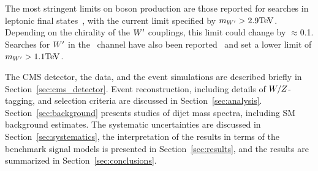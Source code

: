 The most stringent limits on \PWpr boson production  are those reported
for searches in leptonic final
states~\cite{CMSwprimePAPER2013,ATLASwprimePAPER}, with the current
limit specified by $m_{W'}>2.9\mathrm{TeV}$. Depending on the chirality
of the $W'$ couplings, this limit could change by $\approx$0.1\TeVcc. Searches for $W'$ in the \PW\cPZ\ channel have also been
reported~\cite{CMSwprimeWZPAS,ATLASWWPAPER,ATLASwprimeWZPAS} and set
a lower limit of $m_{W'}>1.1\mathrm{TeV}$.

The CMS detector, the data, and the event simulations are described briefly
in Section~\ref{sec:cms_detector}. Event reconstruction, including
details of $W/Z$-tagging, and selection criteria are discussed in
Section~\ref{sec:analysis}. Section~\ref{sec:background} presents
studies of dijet mass spectra, including SM background estimates.
The systematic uncertainties are discussed in Section~\ref{sec:systematics},
the interpretation of the results in terms of the benchmark signal models
is presented in Section~\ref{sec:results}, and the results are summarized in Section~\ref{sec:conclusions}.






